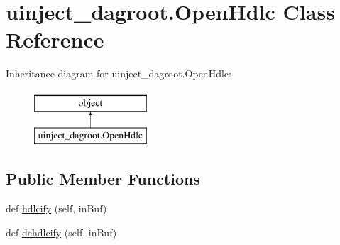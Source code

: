 \hypertarget{classuinject__dagroot_1_1_open_hdlc}{}\section{uinject\+\_\+dagroot.\+Open\+Hdlc Class Reference}
\label{classuinject__dagroot_1_1_open_hdlc}
Inheritance diagram for uinject\+\_\+dagroot.\+Open\+Hdlc\+:\begin{figure}[H]
\begin{center}
\leavevmode
\includegraphics[height=2.000000cm]{classuinject__dagroot_1_1_open_hdlc}
\end{center}
\end{figure}
\subsection*{Public Member Functions}
\begin{DoxyCompactItemize}
\item 
def \hyperlink{classuinject__dagroot_1_1_open_hdlc_a55d8e91f1733696db40b0ad8db9e7d9b}{hdlcify} (self, in\+Buf)
\item 
def \hyperlink{classuinject__dagroot_1_1_open_hdlc_ae7f14aad85429cf173a8e1521c67e4dc}{dehdlcify} (self, in\+Buf)
\end{DoxyCompactItemize}
